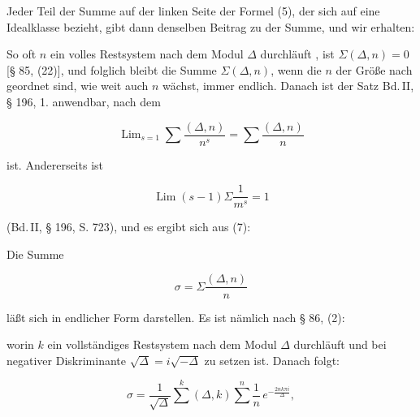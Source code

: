Jeder Teil der Summe auf der linken Seite der Formel (5),
der sich auf eine Idealklasse bezieht, gibt dann denselben Beitrag
zu der Summe, und wir erhalten:



So oft $n$ ein volles Restsystem nach dem Modul $\Delta$ durchläuft
, ist $\Sigma(\Delta,n) = 0$ [§ 85, (22)], und folglich bleibt die Summe
$\Sigma(\Delta,n)$, wenn die $n$ der Größe nach geordnet sind, wie weit
auch $n$ wächst, immer endlich. Danach ist der Satz Bd.\,II,
§ 196, 1. anwendbar, nach dem

\[
\operatorname{Lim}_{s=1}\sum\frac{(\Delta,n)}{n^s} = \sum\frac{(\Delta,n)}{n}
\]

ist. Andererseits ist

\[
\operatorname{Lim}(s-1)\Sigma\frac{1}{m^s} = 1
\]

(Bd.\,II, § 196, S. 723), und es ergibt sich aus (7):


Die Summe

\[
\sigma = \Sigma\frac{(\Delta,n)}{n}
\]

läßt sich in endlicher Form darstellen. Es ist nämlich nach
§ 86, (2):


worin $k$ ein vollständiges Restsystem nach dem Modul $\Delta$ durchläuft
 und bei negativer Diskriminante $\sqrt{\Delta} = i\sqrt{-\Delta}$ zu setzen
ist. Danach folgt:

\[
\sigma = \frac{1}{\sqrt{\Delta}}\sum_{}^{k}(\Delta,k)\sum_{}^{n}\frac{1}{n}\,e^{-\frac{2nk\pi i}{\Delta}},
\]

